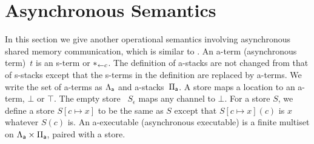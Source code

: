 \documentclass[envcountsame]{llncs}
\begin{document}


\section{Asynchronous Semantics}
\label{sec:async}

In this section we give another operational semantics involving
asynchronous shared memory communication, which is similar to \citet{hiraiflops2012}.
An a-term (asynchronous term)~$t$ is an s-term or
$\ast_{\leftarrow{c}}$.
The definition of a-stacks are not changed from that of s-stacks except
that the s-terms in the definition are replaced by a-terms.
We write the set of a-terms as $\Lambda_{\mathsf a}$ and a-stacks~$\Pi_{\mathsf a}$.
A store maps a location to an a-term, $\bot$ or $\top$.
The empty store%
~$S_\epsilon$ maps any channel to $\bot$.
For a store $S$, we define a store $S[c\mapsto x]$ to be
the same as $S$ except that $S[c\mapsto x](c)$ is $x$ whatever $S(c)$ is.
An a-executable (asynchronous executable)
is a finite multiset on $\Lambda_{\mathsf a} \times \Pi_{\mathsf a}$,
paired with a store.
\end{document}

